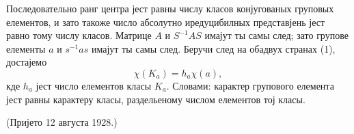 ﻿\documentclass[11pt]{article}
\begin{document}
Последовательно ранг центра јест равны числу класов конјугованых груповых елементов, и зато такоже число абсолутно иредуцибилных представјень јест равно тому числу класов. Матрице $A$ и $S^{-1}AS$ имајут ты самы след; зато групове елементы $a$ и $s^{-1}as$ имајут ты самы след. Беручи след на обадвух странах (1), достајемо
\[
        \chi(K_a)=h_a\chi(a),
\]
кде $h_a$ јест число елементов класы $K_a$. Словами: карактер групового елемента јест равны карактеру класы, раздельеному числом елементов тој класы.

\begin{center}
(Пријето 12 августа 1928.)
\end{center}
\end{document}
